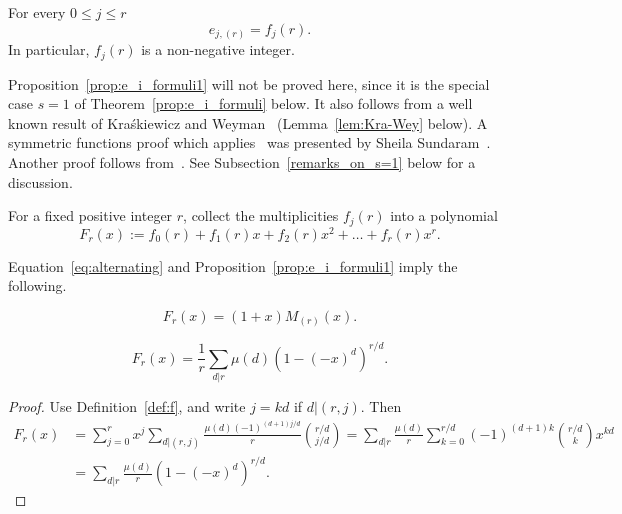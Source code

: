 \begin{proposition}\label{prop:e_i_formuli1}
    For every $0\le j\le r$ 
    \[
        e_{j,(r)} = f_j(r).
    \]
    In particular, $f_j(r)$ is a non-negative integer.
\end{proposition}

\begin{remark}\label{rem:e=s}
    Proposition~\ref{prop:e_i_formuli1} will not be proved here, since it is the special case $s=1$ of Theorem~\ref{prop:e_i_formuli} below. 
    It also follows from a well known result of Kra\'skiewicz and Weyman~\cite{KraskiewiczWeyman} (Lemma~\ref{lem:Kra-Wey} below).
    A symmetric functions proof which applies~\cite[Lemma 2.7]{Sundaram_Adv} was presented by Sheila Sundaram~\cite{Sundaram_personal}. 
    Another proof follows from~\cite[Theorem 3.1]{ET}. 
    See Subsection~\ref{remarks_on_s=1} below for a discussion.
\end{remark}
  
\begin{definition}\label{def:F_polynomial}
    For a fixed positive integer $r$, collect the multiplicities $f_j(r)$ into a polynomial
    \[
	    F_r(x) := f_0(r) + f_1(r)x + f_2(r)x^2+ \ldots + f_r(r)x^r.
    \]
\end{definition}

Equation~\eqref{eq:alternating} and Proposition~\ref{prop:e_i_formuli1} imply the following. 

\begin{corollary}\label{t:F_and_M}
    \[
        F_r(x) = (1+x) M_{(r)}(x).
    \]
\end{corollary}

\begin{observation}\label{t:F}
    \[
        F_r(x) = \frac{1}{r} \sum_{d|r} \mu(d) (1-(-x)^d)^{r/d}.
    \]
\end{observation}

\begin{proof}
    Use Definition~\ref{def:f}, and write $j = kd$ if $d | (r,j)$. Then
    \begin{align*}
        F_r(x) 
        &= \sum_{j=0}^{r} x^j \sum_{d|(r,j)} \frac{\mu(d) (-1)^{(d+1)j/d}}{r} \binom{r/d}{j/d} 
        = \sum_{d|r} \frac{\mu(d)}{r} \sum_{k=0}^{r/d} (-1)^{(d+1)k} \binom{r/d}{k}x^{k d} \\
        &= \sum_{d|r} \frac{\mu(d)}{r} (1-(-x)^d)^{r/d}.
    \end{align*}

\end{proof}
	
